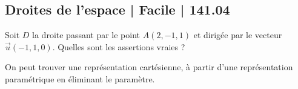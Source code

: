 \subsection{Droites de l'espace | Facile | 141.04}


\begin{question} 

Soit $D$ la droite passant par le point $A(2,-1,1)$ et dirigée par le vecteur $\vec{u}(-1,1,0)$. Quelles sont les assertions vraies ?
\begin{answers}


 
    
    
\end{answers}
\begin{explanations}
On peut trouver une représentation cartésienne, à partir d'une représentation   paramétrique en éliminant le paramètre.
\end{explanations}

\end{question}


